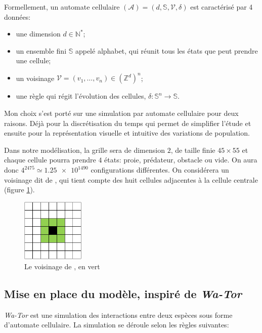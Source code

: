 \documentclass[11pt]{article}
\newcommand{\ensemble}[1]{\mathbb{#1}}
\newcommand{\N}{\ensemble{N}}
\newcommand{\Z}{\ensemble{Z}}
\begin{document}
Formellement, un automate cellulaire $(\mathcal{A}) = (d, \mathbb{S}, \mathcal{V}, \delta)$ est caractérisé par 4 données:
\begin{itemize}[label=\textbullet]
    \item une dimension $d \in \N^*$;
    \item un ensemble fini $\mathbb{S}$ appelé alphabet, qui réunit tous les états que peut prendre une cellule;
    \item un voisinage $\mathcal{V} = (v_1, \dots, v_n) \in (\Z^d)^n$;
    \item une règle qui régit l'évolution des cellules, $\delta: \mathbb{S}^n \longrightarrow \mathbb{S}$.
\end{itemize}

Mon choix s'est porté sur une simulation par automate cellulaire pour deux raisons. Déjà pour la discrétisation du temps qui permet de simplifier l'étude et ensuite pour la représentation visuelle et intuitive des variations de population.

Dans notre modélisation, la grille sera de dimension $2$, de taille finie $45 \times 55$ et chaque cellule pourra prendre $4$ états: proie, prédateur, obstacle ou vide. On aura donc $4^{2475} \simeq \num{1.25e1490}$ configurations différentes. On considérera un voisinage dit de , qui tient compte des huit cellules adjacentes à la cellule centrale (figure \ref{fig:moore}).

\begin{figure}[!ht]
    \centering
    \includegraphics[width=3cm]{Nbhd_moore_1.png}
    \caption{Le voisinage de , en vert}
    \label{fig:moore}
\end{figure}

\subsection{Mise en place du modèle, inspiré de \emph{Wa-Tor}}

\emph{Wa-Tor} est une simulation des interactions entre deux espèces sous forme d'automate cellulaire.  La simulation se déroule selon les règles suivantes:
\end{document}
